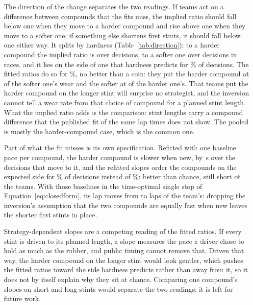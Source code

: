 \documentclass[11pt,a4paper]{article}
\begin{document}
The direction of the change separates the two readings. If teams act on a
difference between compounds that the fits miss, the implied ratio should fall
below one when they move to a harder compound and rise above one when they move
to a softer one; if something else shortens first stints, it should fall below
one either way. It splits by hardness (Table~\ref{tab:direction}): to a harder
compound the implied ratio is \ImpliedHarder{} \ImpliedHarderCi{} over
\ImpliedHarderN{} decisions, to a softer one \ImpliedSofter{}
\ImpliedSofterCi{} over \ImpliedSofterN{} decisions in \ImpliedSofterRaces{}
races, and it lies on the side of one that hardness predicts for
\ImpliedExpectedSide{}\% of decisions. The fitted ratios do so for
\ImpliedFittedExpectedSide{}\%, no better than a coin: they put the harder
compound at \ImpliedFittedHarder{} of the softer one's wear and the softer at
\ImpliedFittedSofter{} of the harder one's. That teams put the harder compound on the
longer stint will surprise no strategist, and the inversion cannot tell a wear
rate from that choice of compound for a planned stint length. What the implied
ratio adds is the comparison: stint lengths carry a compound difference that
the published fit of the same lap times does not show. The pooled
\ImpliedRatio{} is mostly the harder-compound case, which is the common one.

Part of what the fit misses is its own specification. Refitted with one
baseline pace per compound, the harder compound is slower when new, by
\OffsetHarder{}\,s \OffsetHarderCi{} over the decisions that move to it, and
the refitted slopes order the compounds on the expected side for
\OffsetsFittedSide{}\% of decisions instead of \ImpliedFittedExpectedSide{}\%:
better than chance, still short of the teams. With those baselines in the
time-optimal single stop of Equation~\ref{eq:closedform}, its lap moves from \OffsetsGapPlain{} to
\OffsetsGap{} laps \OffsetsGapCi{} of the team's: dropping the inversion's
assumption that the two compounds are equally fast when new leaves the shorter
first stints in place.

Strategy-dependent slopes are a competing reading of the fitted ratios. If
every stint is driven to its planned length, a slope measures the pace a driver
chose to hold as much as the rubber, and public timing cannot remove that.
Driven that way, the harder compound on the longer stint would look gentler,
which pushes the fitted ratios toward the side hardness predicts rather than
away from it, so it does not by itself explain why they sit at chance.
Comparing one compound's slopes on short and long stints would separate the two
readings; it is left for future work.
\end{document}
